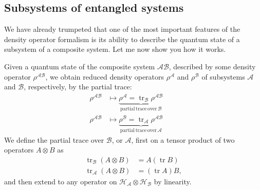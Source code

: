\documentclass[fleqn]{article}
\begin{document}
\hypertarget{subsystems-of-entangled-systems}{%
\subsection{Subsystems of entangled systems}\label{subsystems-of-entangled-systems}}

We have already trumpeted that one of the most important features of the density operator formalism is its ability to describe the quantum state of a subsystem of a composite system.
Let me now show you how it works.

Given a quantum state of the composite system \(\mathcal{AB}\), described by some density operator \(\rho^{\mathcal{AB}}\), we obtain reduced density operators \(\rho^{\mathcal{A}}\) and \(\rho^{\mathcal{B}}\) of subsystems \(\mathcal{A}\) and \(\mathcal{B}\), respectively, by the partial trace:
\[
  \begin{aligned}
    \rho^{\mathcal{AB}}
    &\longmapsto
    \underbrace{\rho^\mathcal{A}=\operatorname{tr}_{\mathcal{B}}\rho^{\mathcal{AB}}}_{\mathrm{partial\,trace\,over}\,\mathcal{B}}\qquad
  \\\rho^{\mathcal{AB}}
    &\longmapsto
    \underbrace{\rho^\mathcal{B}=\operatorname{tr}_{\mathcal{A}}\rho^{\mathcal{AB}}}_{\mathrm{partial\,trace\,over}\,\mathcal{A}}
  \end{aligned}
\]
We define the partial trace over \(\mathcal{B}\), or \(\mathcal{A}\), first on a tensor product of two operators \(A\otimes B\) as
\[
  \begin{aligned}
    \operatorname{tr}_{\mathcal{B}} (A\otimes B)
    &= A(\operatorname{tr}B)
  \\\operatorname{tr}_{\mathcal{A}} (A\otimes B)
    &= (\operatorname{tr}A) B,
  \end{aligned}
\]
and then extend to any operator on \(\mathcal{H}_{\mathcal{A}}\otimes\mathcal{H}_{\mathcal{B}}\) by linearity.
\end{document}
